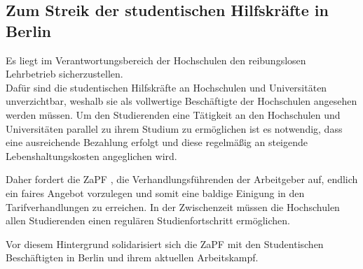 
\subsection{Zum Streik der studentischen Hilfskräfte in Berlin}
Es liegt im Verantwortungsbereich der Hochschulen den	reibungslosen
Lehrbetrieb	sicherzustellen.\\
Dafür sind die studentischen Hilfskräfte an	Hochschulen	und
Universitäten	unverzichtbar, weshalb sie als vollwertige Beschäftigte	der	Hochschulen	angesehen
werden	müssen.	Um	den	Studierenden	eine	Tätigkeit	an	den	Hochschulen	und	Universitäten	parallel
zu	ihrem	Studium	zu	ermöglichen	ist	es	notwendig,	dass	eine	ausreichende	Bezahlung	erfolgt	und
diese	regelmäßig	an	steigende	Lebenshaltungskosten	angeglichen	wird.

Daher	fordert	die	ZaPF , die Verhandlungsführenden der Arbeitgeber auf,	endlich	ein	faires	Angebot	vorzulegen	und	somit	eine
baldige	Einigung	in	den	Tarifverhandlungen	zu	erreichen.	In	der	Zwischenzeit	müssen	die
Hochschulen	allen	Studierenden	einen	regulären	Studienfortschritt	ermöglichen.

Vor	diesem	Hintergrund	solidarisiert	sich	die	ZaPF	mit	den	Studentischen	Beschäftigten	in	Berlin
und	ihrem	aktuellen	Arbeitskampf.
